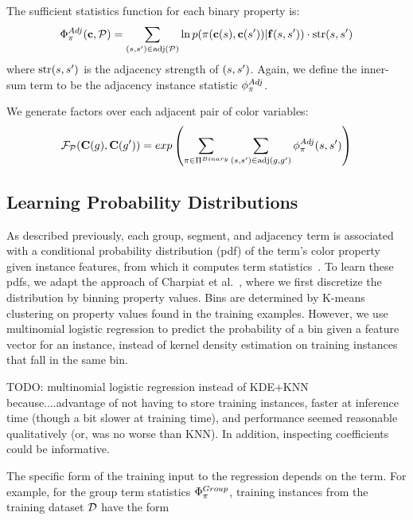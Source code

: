 The sufficient statistics function for each binary property is:
 \begin{equation*}
 \Phi^{Adj}_\pi(\mathbf{c}, \mathcal{P}) =
 	\sum_{(s, s^{\prime}) \in \text{adj}(\mathcal{P})}
 		\ln p( \pi( \mathbf{c}(s), \mathbf{c}(s^{\prime}) ) | \mathbf{f}(s, s^{\prime}) ) \cdot \text{str}(s, s^{\prime}) 
 \end{equation*}
 where $\text{str}(s,s^{\prime})$ is the adjacency strength of $(s,s^{\prime})$. Again, we define the inner-sum term to be the adjacency instance statistic $\phi^{Adj}_\pi$.

 We generate factors over each adjacent pair of color variables:
  \begin{equation*}
 \mathcal{F}_{\mathcal{P}}(\mathbf{C}(g), \mathbf{C}(g^{\prime})) = exp\left(\sum_{\pi \in \Pi^{Binary}}\sum_{(s, s^{\prime}) \in \text{adj}(g, g^{\prime})} \phi^{Adj}_\pi(s, s^{\prime})\right) 
 \end{equation*}


\subsection{Learning Probability Distributions}

As described previously, each group, segment, and adjacency term is associated with a conditional probability distribution (pdf) of the term's color property given instance features, from which it computes term statistics~. To learn these pdfs, we adapt the approach of Charpiat et al.~, where we first discretize the distribution by binning property values. Bins are determined by K-means clustering on property values found in the training examples. However, we use multinomial logistic regression to predict the probability of a bin given a feature vector for an instance, instead of kernel density estimation on training instances that fall in the same bin. 

TODO: multinomial logistic regression instead of KDE+KNN because....advantage of not having to store training instances, faster at inference time (though a bit slower at training time), and performance seemed reasonable qualitatively (or, was no worse than KNN). In addition, inspecting coefficients could be informative.  

The specific form of the training input to the regression depends on the term. For example, for the group term statistics $\Phi^{Group}_\pi$, training instances from the training dataset $\mathcal{D}$ have the form 

